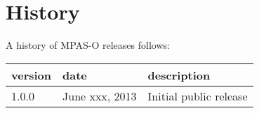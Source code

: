 \chapter*{History}
\label{chap:history}

A history of MPAS-O releases follows: \\


\begin{tabular}{lll} 
\hline\hline version & date & description  \\
\hline 
1.0.0 & June xxx, 2013 & Initial public release \\
\hline 
\end{tabular} 


\newpage